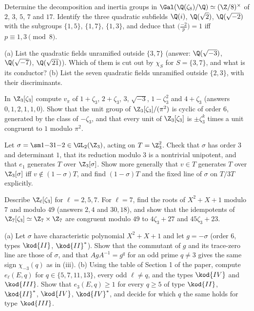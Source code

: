 \begin{exercise}\label{ex:ant:ex-zeta8}
Determine the decomposition and inertia groups in $\Gal(\Q(\zeta_8)/\Q)\simeq(\Z/8)^\times$ of $2$, $3$, $5$, $7$ and $17$. Identify the three quadratic subfields
$\Q(i)$, $\Q(\sqrt2)$, $\Q(\sqrt{-2})$ with the subgroups $\{1,5\}$, $\{1,7\}$, $\{1,3\}$, and deduce that $\bigl(\frac{-2}p\bigr)=1$ iff $p\equiv1,3\pmod8$.
\end{exercise}

\begin{exercise}\label{ex:ant:ex-unramified}
(a) List the quadratic fields unramified outside $\{3,7\}$ (answer: $\Q(\sqrt{-3})$, $\Q(\sqrt{-7})$, $\Q(\sqrt{21})$). Which of them is cut out by $\chi_S$ for $S=\{3,7\}$,
and what is its conductor? (b) List the seven quadratic fields unramified outside $\{2,3\}$, with their discriminants.
\end{exercise}

\begin{exercise}\label{ex:ant:ex-valuations}
In $\Z_3[\zeta_3]$ compute $v_\pi$ of $1+\zeta_3$, $2+\zeta_3$, $3$, $\sqrt{-3}$, $1-\zeta_3^2$ and $4+\zeta_3$ (answers $0,1,2,1,1,0$). Show that the unit group of
$\Z_3[\zeta_3]/(\pi^2)$ is cyclic of order $6$, generated by the class of $-\zeta_3$, and that every unit of $\Z_3[\zeta_3]$ is $\pm\zeta_3^k$ times a unit congruent to $1$
modulo $\pi^2$.
\end{exercise}

\begin{exercise}\label{ex:ant:ex-sigma}
Let $\sigma=\sm1{-3}1{-2}\in\GL_2(\Z_3)$, acting on $T=\Z_3^2$. Check that $\sigma$ has order $3$ and determinant $1$, that its reduction modulo $3$ is a nontrivial
unipotent, and that $e_1$ generates $T$ over $\Z_3[\sigma]$. Show more generally that $v\in T$ generates $T$ over $\Z_3[\sigma]$ iff $v\notin(1-\sigma)T$, and find
$(1-\sigma)T$ and the fixed line of $\sigma$ on $T/3T$ explicitly.
\end{exercise}

\begin{exercise}\label{ex:ant:ex-z7}
Describe $\Z_\ell[\zeta_3]$ for $\ell=2,5,7$. For $\ell=7$, find the roots of $X^2+X+1$ modulo $7$ and modulo $49$ (answers $2,4$ and $30,18$), and show that the
idempotents of $\Z_7[\zeta_3]\simeq\Z_7\times\Z_7$ are congruent modulo $49$ to $4\zeta_3+27$ and $45\zeta_3+23$.
\end{exercise}

\begin{exercise}\label{ex:ant:ex-euler}
(a) Let $\sigma$ have characteristic polynomial $X^2+X+1$ and let $g=-\sigma$ (order $6$, types $\kod{II}$, $\kod{II}^*$). Show that the commutant of $g$ and its
trace-zero line are those of $\sigma$, and that $AgA^{-1}=g^q$ for an odd prime $q\ne3$ gives the same sign $\chi_{-3}(q)$ as in (iii).
(b) Using the table of Section 1 of the paper, compute $e_\ell(E,q)$ for $q\in\{5,7,11,13\}$, every odd $\ell\ne q$, and the types $\kod{IV}$ and $\kod{III}$. Show that
$e_3(E,q)\ge1$ for every $q\ge5$ of type $\kod{II}$, $\kod{II}^*$, $\kod{IV}$, $\kod{IV}^*$, and decide for which $q$ the same holds for type $\kod{III}$.
\end{exercise}

